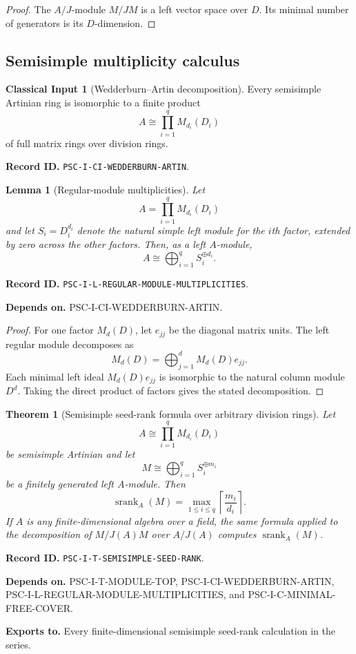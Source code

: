 \documentclass[11pt]{article}
\newtheorem{theorem}{Theorem}[section]
\newtheorem{lemma}[lemma]{Lemma}
\theoremstyle{definition}
\newtheorem{classicalinput}[classicalinput]{Classical Input}
\theoremstyle{remark}
\newcommand{\srank}{\operatorname{srank}}
\newcommand{\RecordID}[1]{\par\smallskip\noindent\begingroup\footnotesize\color{PSCGray}\raggedright\textbf{Record ID.} \nolinkurl{#1}.\par\endgroup}
\newcommand{\Depends}[1]{\par\noindent\begingroup\footnotesize\color{PSCGray}\raggedright\textbf{Depends on.} #1\par\endgroup}
\newcommand{\Exports}[1]{\par\noindent\begingroup\footnotesize\color{PSCGray}\raggedright\textbf{Exports to.} #1\par\endgroup}
\begin{document}
\begin{proof}
The $A/J$-module $M/JM$ is a left vector space over $D$.  Its minimal number of generators is its $D$-dimension.
\end{proof}

\subsection{Semisimple multiplicity calculus}
\begin{classicalinput}[Wedderburn--Artin decomposition]
\label{ci:wedderburn}
Every semisimple Artinian ring is isomorphic to a finite product
\[
A\cong\prod_{i=1}^{q}M_{d_i}(D_i)
\]
of full matrix rings over division rings.
\end{classicalinput}
\RecordID{PSC-I-CI-WEDDERBURN-ARTIN}

\begin{lemma}[Regular-module multiplicities]
\label{lem:regular-multiplicities}
Let
\[
A=\prod_{i=1}^{q}M_{d_i}(D_i)
\]
and let $S_i=D_i^{d_i}$ denote the natural simple left module for the $i$th factor, extended by zero across the other factors.  Then, as a left $A$-module,
\[
\boxed{A\cong\bigoplus_{i=1}^{q}S_i^{\oplus d_i}.}
\]
\end{lemma}
\RecordID{PSC-I-L-REGULAR-MODULE-MULTIPLICITIES}
\Depends{PSC-I-CI-WEDDERBURN-ARTIN.}

\begin{proof}
For one factor $M_d(D)$, let $e_{jj}$ be the diagonal matrix units.  The left regular module decomposes as
\[
M_d(D)=\bigoplus_{j=1}^{d}M_d(D)e_{jj}.
\]
Each minimal left ideal $M_d(D)e_{jj}$ is isomorphic to the natural column module $D^d$.  Taking the direct product of factors gives the stated decomposition.
\end{proof}

\begin{theorem}[Semisimple seed-rank formula over arbitrary division rings]
\label{thm:semisimple-seed-rank}
Let
\[
A\cong\prod_{i=1}^{q}M_{d_i}(D_i)
\]
be semisimple Artinian and let
\[
M\cong\bigoplus_{i=1}^{q}S_i^{\oplus m_i}
\]
be a finitely generated left $A$-module.  Then
\[
\boxed{
\srank_A(M)
=
\max_{1\leq i\leq q}
\left\lceil\frac{m_i}{d_i}\right\rceil.
}
\]
If $A$ is any finite-dimensional algebra over a field, the same formula applied to the decomposition of $M/J(A)M$ over $A/J(A)$ computes $\srank_A(M)$.
\end{theorem}
\RecordID{PSC-I-T-SEMISIMPLE-SEED-RANK}
\Depends{PSC-I-T-MODULE-TOP, PSC-I-CI-WEDDERBURN-ARTIN, PSC-I-L-REGULAR-MODULE-MULTIPLICITIES, and PSC-I-C-MINIMAL-FREE-COVER.}
\Exports{Every finite-dimensional semisimple seed-rank calculation in the series.}
\end{document}
